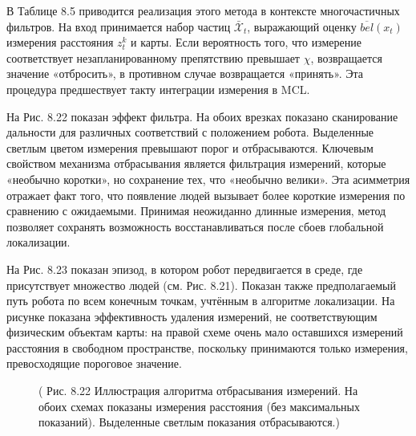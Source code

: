 \documentclass[10pt,a4paper]{article}
\begin{document}
В Таблице 8.5 приводится реализация этого метода в контексте многочастичных фильтров.  На вход принимается набор частиц $\bar{\mathcal{X}}_t$, выражающий оценку $\overline{bel}(x_t)$ измерения расстояния $z_t^k$ и карты.  Если вероятность того, что измерение соответствует незапланированному препятствию превышает $\chi$, возвращается значение «отбросить», в противном случае возвращается «принять». Эта процедура предшествует такту интеграции измерения в MCL.

На Рис. 8.22 показан эффект фильтра. На обоих врезках показано сканирование дальности для различных соответствий с положением робота. Выделенные светлым цветом измерения превышают порог и отбрасываются. Ключевым свойством механизма отбрасывания является фильтрация измерений, которые «необычно коротки», но сохранение тех, что «необычно велики». Эта асимметрия отражает факт того, что появление людей вызывает более короткие измерения по сравнению с ожидаемыми. Принимая неожиданно длинные измерения, метод позволяет сохранять возможность восстанавливаться после сбоев глобальной локализации. 

На Рис. 8.23 показан эпизод, в котором робот передвигается в среде, где присутствует множество людей (см. Рис. 8.21). Показан также предполагаемый путь робота по всем конечным точкам, учтённым в алгоритме локализации. На рисунке показана эффективность удаления измерений, не соответствующим физическим объектам карты: на правой схеме очень мало оставшихся измерений расстояния в свободном пространстве, поскольку принимаются только измерения, превосходящие пороговое значение.

\begin{figure}[H]
	\caption{ ( Рис. 8.22 Иллюстрация алгоритма отбрасывания измерений. На обоих схемах показаны измерения расстояния (без максимальных показаний). Выделенные светлым показания отбрасываются.)}
	\label{fig:822orig}
\end{figure}
\end{document}
